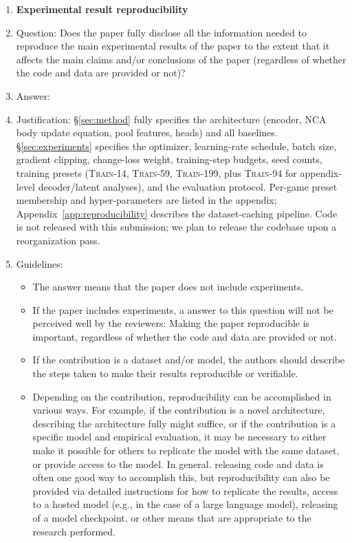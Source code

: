 \begin{enumerate}
    \item {\bf Experimental result reproducibility}
    \item[] Question: Does the paper fully disclose all the information needed to reproduce the main experimental results of the paper to the extent that it affects the main claims and/or conclusions of the paper (regardless of whether the code and data are provided or not)?
    \item[] Answer: \answerYes{}
    \item[] Justification: \S\ref{sec:method} fully specifies the architecture (encoder, NCA body update equation, pool features, heads) and all baselines. \S\ref{sec:experiments} specifies the optimizer, learning-rate schedule, batch size, gradient clipping, change-loss weight, training-step budgets, seed counts, training presets (\textsc{Train-14}, \textsc{Train-59}, \textsc{Train-199}, plus \textsc{Train-94} for appendix-level decoder/latent analyses), and the evaluation protocol. Per-game preset membership and hyper-parameters are listed in the appendix; Appendix~\ref{app:reproducibility} describes the dataset-caching pipeline. Code is not released with this submission; we plan to release the codebase upon a reorganization pass.
    \item[] Guidelines:
    \begin{itemize}
        \item The answer \answerNA{} means that the paper does not include experiments.
        \item If the paper includes experiments, a \answerNo{} answer to this question will not be perceived well by the reviewers: Making the paper reproducible is important, regardless of whether the code and data are provided or not.
        \item If the contribution is a dataset and\slash or model, the authors should describe the steps taken to make their results reproducible or verifiable.
        \item Depending on the contribution, reproducibility can be accomplished in various ways. For example, if the contribution is a novel architecture, describing the architecture fully might suffice, or if the contribution is a specific model and empirical evaluation, it may be necessary to either make it possible for others to replicate the model with the same dataset, or provide access to the model. In general. releasing code and data is often one good way to accomplish this, but reproducibility can also be provided via detailed instructions for how to replicate the results, access to a hosted model (e.g., in the case of a large language model), releasing of a model checkpoint, or other means that are appropriate to the research performed.

\end{itemize}
\end{enumerate}
